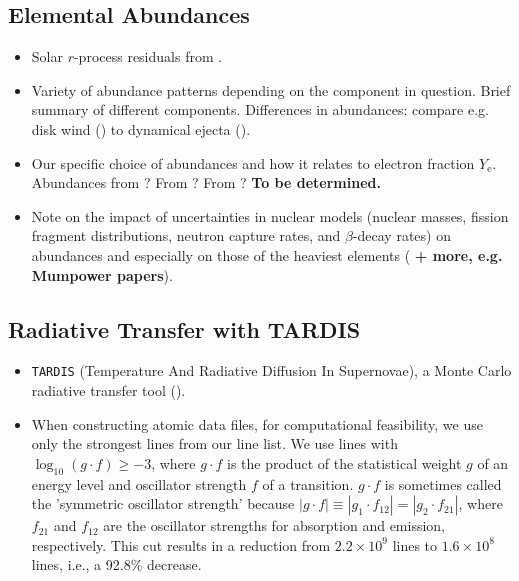 \documentclass[twocolumn]{aastex63}
\begin{document}
\subsection{Elemental Abundances}
\begin{itemize}
    \item Solar $r$-process residuals from \cite{sneden08}.
    
    \item Variety of abundance patterns depending on the component in question. Brief summary of different components. Differences in abundances: compare e.g. disk wind (\citealt{wu16}) to dynamical ejecta (\citealt{wanajo14}). 
    
    \item Our specific choice of abundances and how it relates to electron fraction $Y_\mathrm{e}$. Abundances from \cite{wanajo14}? From \cite{wanajo18}? From \cite{lippuner15}? \textbf{To be determined.} 
    
    \item Note on the impact of uncertainties in nuclear models (nuclear masses, fission fragment distributions, neutron capture rates, and $\beta$-decay rates) on abundances and especially on those of the heaviest elements (\citealt{eichler15, barnes16, cote18} \textbf{+ more, e.g. Mumpower papers}).
\end{itemize}

\subsection{Radiative Transfer with \textsc{TARDIS}}\label{ssc:TARDIS}
\begin{itemize}

    \item \texttt{TARDIS} (Temperature And Radiative Diffusion In Supernovae), a Monte Carlo radiative transfer tool (\citealt{kerzendorf14}).
    
    \item When constructing atomic data files, for computational feasibility, we use only the strongest lines from our line list. We use lines with $\log_{10}(g \cdot f) \geqslant -3$, where $g \cdot f$ is the product of the statistical weight $g$ of an energy level and oscillator strength $f$ of a transition. $g \cdot f$ is sometimes called the 'symmetric oscillator strength' because $|g\cdot f| \equiv |g_1 \cdot f_{12}| = |g_2 \cdot f_{21}|$, where $f_{21}$ and $f_{12}$ are the oscillator strengths for absorption and emission, respectively. This cut results in a reduction from $2.2 \times 10^9$ lines to $1.6 \times 10^8$ lines, i.e., a 92.8\% decrease.
\end{itemize}
\end{document}
